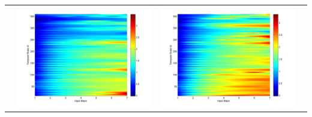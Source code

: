 \documentclass[11pt]{article}
\begin{document}
\begin{table}[H]
{\begin{tabular}{c  c   c   c  }
&\begin{minipage}{.3\textwidth}\includegraphics[width=\linewidth]{resultgraph/13337000pep.png}\end{minipage}
&\begin{minipage}{.3\textwidth}\includegraphics[width=\linewidth]{resultgraph/13337000pepq.png}\end{minipage}
\\

\end{tabular}}
\end{table}
\end{document}
